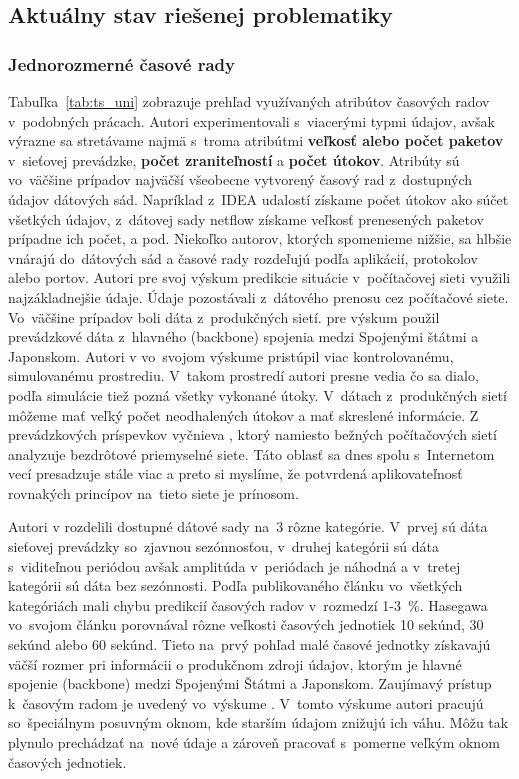 \documentclass[thesismargins, thesislinespacing, openright, upjsfrontpage]{rnthesis}
\begin{document}
\subsection{Aktuálny stav riešenej problematiky}

\subsubsection{Jednorozmerné časové rady}

Tabuľka~\ref{tab:ts_uni} zobrazuje prehľad využívaných atribútov časových radov v~podobných prácach. Autori experimentovali s~viacerými typmi údajov, avšak výrazne sa stretávame najmä s~troma atribútmi \textbf{veľkosť alebo počet paketov} v~sieťovej prevádzke, \textbf{počet zraniteľností} a \textbf{počet útokov}. Atribúty sú vo~väčšine prípadov najväčší všeobecne vytvorený časový rad z~dostupných údajov dátových sád. Napríklad z~IDEA udalostí získame počet útokov ako súčet všetkých údajov, z~dátovej sady netflow získame veľkosť prenesených paketov prípadne ich počet, a pod. Niekoľko autorov, ktorých spomenieme nižšie, sa hlbšie vnárajú do~dátových sád a časové rady rozdeľujú podľa aplikácií, protokolov alebo portov. 
Autori \cite{jiang2004detecting, wei2012intrusion,madan2018predicting, sang2002predictability,wang2008internet,hasegawa2001applications} pre svoj výskum predikcie situácie v~počítačovej sieti využili najzákladnejšie údaje. Údaje pozostávali z~dátového prenosu cez počítačové siete. Vo~väčšine prípadov boli dáta z~produkčných sietí. \cite{hasegawa2001applications} pre výskum použil prevádzkové dáta z~hlavného (backbone) spojenia medzi Spojenými štátmi a Japonskom. Autori v \cite{jiang2004detecting} vo~svojom výskume pristúpil viac kontrolovanému, simulovanému prostrediu. V~takom prostredí autori presne vedia čo sa dialo, podľa simulácie tiež pozná všetky vykonané útoky. V~dátach z~produkčných sietí môžeme mať veľký počet neodhalených útokov a mať skreslené informácie. Z prevádzkových príspevkov vyčnieva \cite{wei2012intrusion}, ktorý namiesto bežných počítačových sietí analyzuje bezdrôtové priemyselné siete. Táto oblasť sa dnes spolu s~Internetom vecí presadzuje stále viac a preto si myslíme, že potvrdená aplikovateľnosť rovnakých princípov na~tieto siete je prínosom.

Autori v \cite{cortez2012multi} rozdelili dostupné dátové sady na~3 rôzne kategórie. V~prvej sú dáta sieťovej prevádzky so~zjavnou sezónnosťou, v~druhej kategórii sú dáta s~viditeľnou periódou avšak amplitúda v~periódach je náhodná a v~tretej kategórii sú dáta bez sezónnosti. Podľa publikovaného článku vo~všetkých kategóriách mali chybu predikcií časových radov v~rozmedzí 1-3~\%. Hasegawa vo~svojom článku \cite{hasegawa2001applications} porovnával rôzne veľkosti časových jednotiek 10 sekúnd, 30 sekúnd alebo 60 sekúnd. Tieto na~prvý pohľad malé časové jednotky získavajú väčší rozmer pri informácii o produkčnom zdroji údajov, ktorým je hlavné spojenie (backbone) medzi Spojenými Štátmi a Japonskom. Zaujímavý prístup k~časovým radom je uvedený vo~výskume \cite{papagiannaki2005long}. V~tomto výskume autori pracujú so~špeciálnym posuvným oknom, kde starším údajom znižujú ich váhu. Môžu tak plynulo prechádzať na~nové údaje a zároveň pracovať s~pomerne veľkým oknom časových jednotiek.
\end{document}
